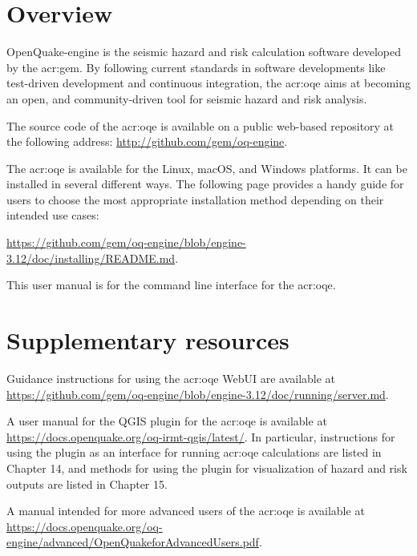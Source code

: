 \section{Overview}

OpenQuake-engine is the seismic hazard and risk calculation software developed by
the \glsdesc{acr:gem}. By following current standards in software
developments like test-driven development and continuous integration, the
\glsdesc{acr:oqe} aims at becoming an open, and community-driven tool for
seismic hazard and risk analysis.

The source code of the \glsdesc{acr:oqe} is available on a public web-based
repository at the following address:
\href{http://github.com/gem/oq-engine}{http://github.com/gem/oq-engine}.

The \glsdesc{acr:oqe} is available for the Linux, macOS, and Windows
platforms. It can be installed in several different ways. The following page
provides a handy guide for users to choose the most appropriate installation
method depending on their intended use cases:

\href{https://github.com/gem/oq-engine/blob/engine-3.12/doc/installing/README.md}{https://github.com/gem/oq-engine/blob/engine-3.12/doc/installing/README.md}.

This user manual is for the command line interface for the \glsdesc{acr:oqe}.


\section{Supplementary resources}

Guidance instructions for using the \glsdesc{acr:oqe} WebUI are available 
at \href{https://github.com/gem/oq-engine/blob/engine-3.12/doc/running/server.md}{https://github.com/gem/oq-engine/blob/engine-3.12/doc/running/server.md}.

A user manual for the QGIS plugin for the \glsdesc{acr:oqe} is available at 
\href{https://docs.openquake.org/oq-irmt-qgis/latest/}{https://docs.openquake.org/oq-irmt-qgis/latest/}. 
In particular, instructions for using the plugin as an interface for running \glsdesc{acr:oqe}
calculations are listed in Chapter 14, and methods for using the plugin for visualization 
of hazard and risk outputs are listed in Chapter 15.

A manual intended for more advanced users of the \glsdesc{acr:oqe} is available
at \href{https://docs.openquake.org/oq-engine/advanced/OpenQuakeforAdvancedUsers.pdf}{https://docs.openquake.org/oq-engine/advanced/OpenQuakeforAdvancedUsers.pdf}.

